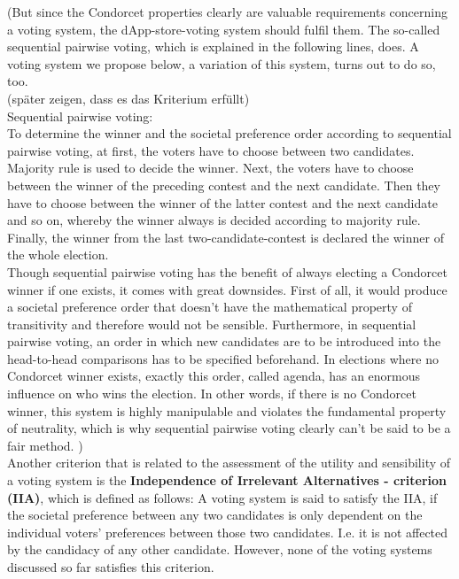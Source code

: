 (But since the Condorcet properties clearly are valuable requirements concerning a voting system, the dApp-store-voting system should fulfil them. The so-called sequential pairwise voting, which is explained in the following lines, does. A voting system we propose below, a variation of this system, turns out to do so, too.\\ (später zeigen, dass es das Kriterium erfüllt)\\
Sequential pairwise voting: \\
To determine the winner and the societal preference order according to sequential pairwise voting, at first, the voters have to choose between two candidates. Majority rule is used to decide the winner. Next, the voters have to choose between the winner of the preceding contest and the next candidate. Then they have to choose between the winner of the latter contest and the next candidate and so on, whereby the winner always is decided according to majority rule. Finally, the winner from the last two-candidate-contest is declared the winner of the whole election. \\
Though sequential pairwise voting has the benefit of always electing a Condorcet winner if one exists, it comes with great downsides. First of all, it would produce a societal preference order that doesn't have the mathematical property of transitivity and therefore would not be sensible. Furthermore, in sequential pairwise voting, an order in which new candidates are to be introduced into the head-to-head comparisons has to be specified beforehand. In elections where no Condorcet winner exists, exactly this order, called agenda, has an enormous influence on who wins the election. In other words, if there is no Condorcet winner, this system is highly manipulable and violates the fundamental property of neutrality, which is why sequential pairwise voting clearly can't be said to be a fair method. )\\

Another criterion that is related to the assessment of the utility and sensibility of a voting system is the {\textbf{Independence of Irrelevant Alternatives - criterion (IIA)}}, which is defined as follows: A voting system is said to satisfy the IIA, if the societal preference between any two candidates is only dependent on the individual voters' preferences between those two candidates. I.e. it is not affected by the candidacy of any other candidate. 
However, none of the voting systems discussed so far satisfies this criterion. \\

